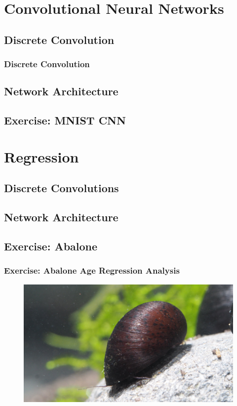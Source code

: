 \documentclass[aspectratio=169]{beamer}
\newcommand\imageright[1]{ %
    \caption*{\scalebox{.5}{\textcolor{lightgray}{\textcopyright~#1}}} %
}
\begin{document}
\section{Convolutional Neural Networks}
\label{sec:convolutional-neural-networks}

\subsection{Discrete Convolution}
\label{subsec:discrete-convolution}

\begin{frame}
    \frametitle{Discrete Convolution}
    \begin{figure}
        \centering
        \imageright{Machine Learning Guru}
    \end{figure}
\end{frame}

\subsection{Network Architecture}
\subsection{Exercise: MNIST CNN}

\section{Regression}

\subsection{Discrete Convolutions}
\subsection{Network Architecture}
\subsection{Exercise: Abalone}

\begin{frame}
    \frametitle{Exercise: Abalone Age Regression Analysis}
    \begin{figure}
        \centering
        \includegraphics[width=0.7\linewidth]{abalone.jpg}
        \imageright{Garnelaxia}
    \end{figure}
\end{frame}
\end{document}
